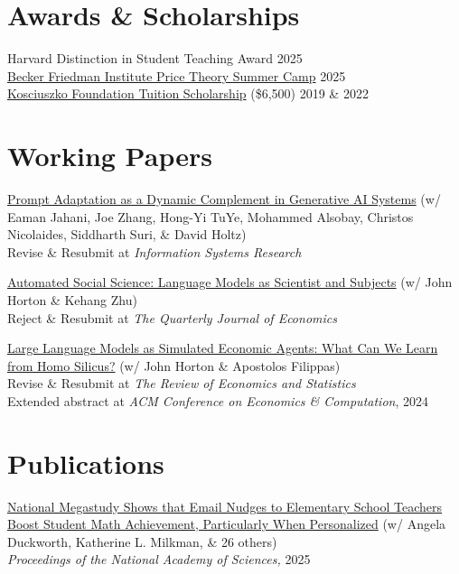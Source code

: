 \documentclass[margin,line,pifont,palatino,courier, 9pt]{res}
\begin{document}
\begin{resume}
\section{\sc Awards \& Scholarships}
Harvard Distinction in Student Teaching Award \hfill 2025 \\
\href{https://bfi.uchicago.edu/events/event/2025-price-theory-summer-camp/}{Becker Friedman Institute Price Theory Summer Camp} \hfill 2025 \\
\href{https://thekf.org/scholarship/tuition-scholarships/tuition-scholarships-for-graduate-studies/}{Kosciuszko Foundation Tuition Scholarship} (\$6,500) \hfill 2019 \& 2022 


\section{\sc Working Papers}

\href{https://arxiv.org/abs/2407.14333}{Prompt Adaptation as a Dynamic Complement in Generative AI Systems} (w/ Eaman Jahani, Joe Zhang, Hong-Yi TuYe, Mohammed Alsobay, Christos Nicolaides, Siddharth
Suri, \& David Holtz)\\
Revise \& Resubmit at \textit{Information Systems Research}

\href{https://www.nber.org/papers/w32381}{Automated Social Science: Language Models as Scientist and Subjects} (w/ John Horton \& Kehang Zhu)\\
Reject \& Resubmit at \textit{The Quarterly Journal of Economics}

\href{https://www.nber.org/papers/w31122}{Large Language Models as Simulated Economic Agents: What Can We Learn from Homo Silicus?} (w/ John Horton \& Apostolos Filippas)\\
Revise \& Resubmit at \textit{The Review of Economics and Statistics}\\
Extended abstract at \textit{ACM Conference on Economics \& Computation}, 2024


\section{\sc Publications}
\href{https://www.pnas.org/doi/10.1073/pnas.2418616122}{National Megastudy Shows that Email Nudges to Elementary School Teachers Boost Student Math Achievement, Particularly When Personalized} (w/ Angela Duckworth, Katherine L. Milkman, \& 26 others)\\
\textit{Proceedings of the National Academy of Sciences,} 2025


\end{resume}
\end{document}
